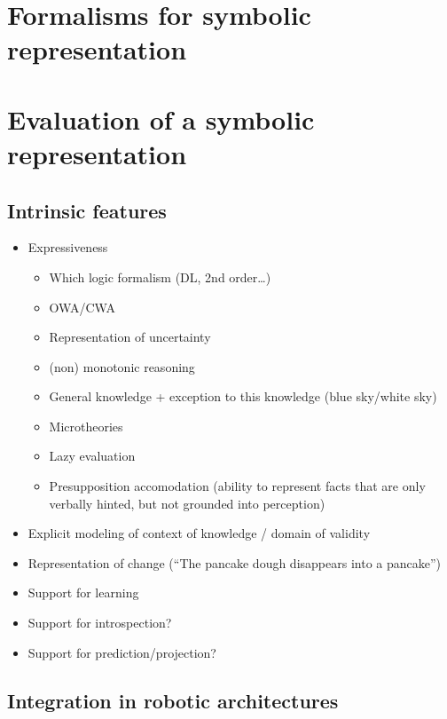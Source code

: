 \section{Formalisms for symbolic representation}
\label{sect|formalisms}

\section{Evaluation of a symbolic representation }
\label{sect|krs-evaluation}


\subsection{Intrinsic features}
\label{sect|eval-intrinsic-features}

\begin{itemize}
	\item Expressiveness
	\begin{itemize}
		\item Which logic formalism (DL, 2nd order…)
		\item OWA/CWA
		\item Representation of uncertainty
		\item (non) monotonic reasoning
		\item General knowledge + exception to this knowledge (blue sky/white sky)
		\item Microtheories
		\item Lazy evaluation
		\item Presupposition accomodation (ability to represent facts that are only verbally hinted, but not grounded into perception)
	\end{itemize}
    \item Explicit modeling of context of knowledge / domain of validity
    \item Representation of change (“The pancake dough disappears into a pancake”)
    \item Support for learning
    \item Support for introspection?
    \item Support for prediction/projection?
\end{itemize}

\subsection{Integration in robotic architectures}
\label{sect|eval-integration-robotic-archi}

